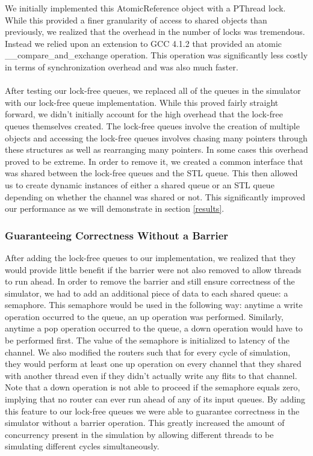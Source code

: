 \documentclass[twocolumn]{article}
\begin{document}
We initially implemented this AtomicReference object with a PThread
lock.  While this provided a finer granularity of access to shared
objects than previously, we realized that the overhead in the number of
locks was tremendous.  Instead we relied upon an extension to GCC 4.1.2
that provided an atomic \_\_compare\_and\_exchange operation.
This operation was significantly less costly in terms of synchronization
overhead and was also much faster.\\
~\\
After testing our lock-free queues, we replaced all of
the queues in the simulator with our lock-free queue implementation.  While this
proved fairly straight forward, we didn't initially account for the high
overhead that the lock-free queues themselves created.  The lock-free
queues involve the creation of multiple objects and accessing the
lock-free queues involves chasing many pointers through these structures
as well as rearranging many pointers.  In some cases this overhead proved
to be extreme.  In order to remove it, we created a common interface that
was shared between the lock-free queues and the STL queue.  This then
allowed us to create dynamic instances of either a shared queue or an STL
queue depending on whether the channel was shared or not.  This significantly
improved our performance as we will demonstrate in section \ref{results}.

\subsubsection{Guaranteeing Correctness Without a Barrier}
After adding the lock-free queues to our implementation, we realized that
they would provide little benefit if the barrier were not also removed to
allow threads to run ahead.  In order to remove the barrier and still ensure correctness of the simulator, we had to add
an additional piece of data to each shared queue: a semaphore.  This
semaphore would be used in the following way: anytime a write operation
occurred to the queue, an up operation was performed.  Similarly, anytime
a pop operation occurred to the queue, a down operation would have to be
performed first. The value of the semaphore is initialized to latency of the channel. We also modified the routers such that for every cycle
of simulation, they would perform at least one up operation on every
channel that they shared with another thread even if they didn't actually
write any flits to that channel.  Note that a down operation is not able
to proceed if the semaphore equals zero, implying that no router can ever
run ahead of any of its input queues.  By adding this feature to our
lock-free queues we were able to guarantee correctness in the simulator
without a barrier operation.  This greatly increased the amount of
concurrency present in the simulation by allowing different threads to be
simulating different cycles simultaneously.
\end{document}
